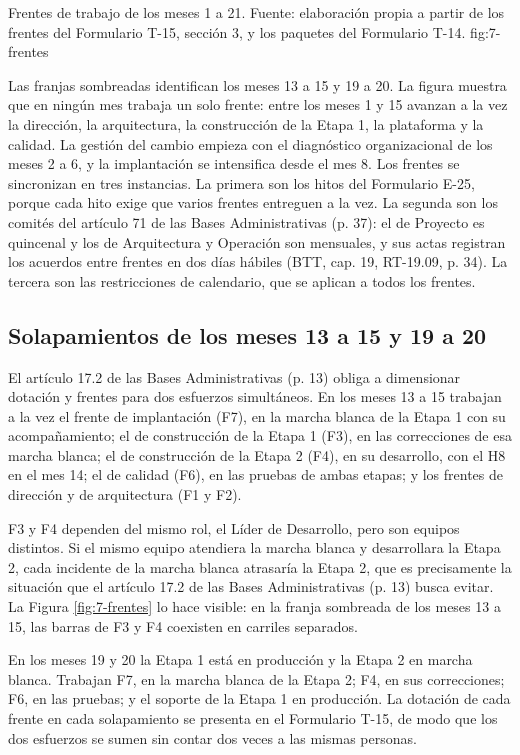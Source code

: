   {Frentes de trabajo de los meses 1 a 21. Fuente: elaboración propia a partir de los frentes del Formulario T-15, sección 3, y los paquetes del Formulario T-14.}
  {fig:7-frentes}

Las franjas sombreadas identifican los meses 13 a 15 y 19 a 20. La figura muestra que en ningún mes trabaja un solo frente: entre los meses 1 y 15 avanzan a la vez la dirección, la arquitectura, la construcción de la Etapa 1, la plataforma y la calidad. La gestión del cambio empieza con el diagnóstico organizacional de los meses 2 a 6, y la implantación se intensifica desde el mes 8. Los frentes se sincronizan en tres instancias. La primera son los hitos del Formulario E-25, porque cada hito exige que varios frentes entreguen a la vez. La segunda son los comités del artículo 71 de las Bases Administrativas (p. 37): el de Proyecto es quincenal y los de Arquitectura y Operación son mensuales, y sus actas registran los acuerdos entre frentes en dos días hábiles (BTT, cap. 19, RT-19.09, p. 34). La tercera son las restricciones de calendario, que se aplican a todos los frentes.

\subsection{Solapamientos de los meses 13 a 15 y 19 a 20}

El artículo 17.2 de las Bases Administrativas (p. 13) obliga a dimensionar dotación y frentes para dos esfuerzos simultáneos. En los meses 13 a 15 trabajan a la vez el frente de implantación (F7), en la marcha blanca de la Etapa 1 con su acompañamiento; el de construcción de la Etapa 1 (F3), en las correcciones de esa marcha blanca; el de construcción de la Etapa 2 (F4), en su desarrollo, con el H8 en el mes 14; el de calidad (F6), en las pruebas de ambas etapas; y los frentes de dirección y de arquitectura (F1 y F2).

F3 y F4 dependen del mismo rol, el Líder de Desarrollo, pero son equipos distintos. Si el mismo equipo atendiera la marcha blanca y desarrollara la Etapa 2, cada incidente de la marcha blanca atrasaría la Etapa 2, que es precisamente la situación que el artículo 17.2 de las Bases Administrativas (p. 13) busca evitar. La Figura \ref{fig:7-frentes} lo hace visible: en la franja sombreada de los meses 13 a 15, las barras de F3 y F4 coexisten en carriles separados.

En los meses 19 y 20 la Etapa 1 está en producción y la Etapa 2 en marcha blanca. Trabajan F7, en la marcha blanca de la Etapa 2; F4, en sus correcciones; F6, en las pruebas; y el soporte de la Etapa 1 en producción. La dotación de cada frente en cada solapamiento se presenta en el Formulario T-15, de modo que los dos esfuerzos se sumen sin contar dos veces a las mismas personas.

